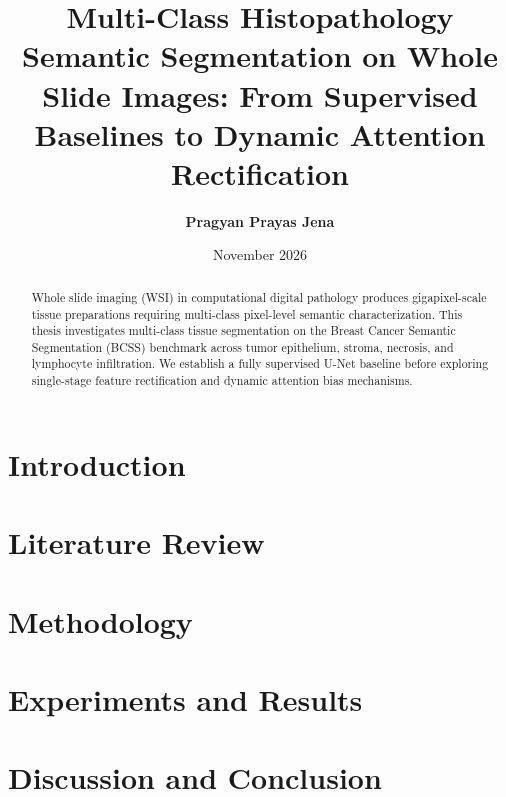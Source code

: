 \documentclass[12pt,a4paper,oneside]{report}
\title{\textbf{Multi-Class Histopathology Semantic Segmentation on Whole Slide Images: From Supervised Baselines to Dynamic Attention Rectification}}
\author{\textbf{Pragyan Prayas Jena}}
\date{November 2026}
\begin{document}
\maketitle

\begin{abstract}
Whole slide imaging (WSI) in computational digital pathology produces gigapixel-scale tissue preparations requiring multi-class pixel-level semantic characterization. This thesis investigates multi-class tissue segmentation on the Breast Cancer Semantic Segmentation (BCSS) benchmark across tumor epithelium, stroma, necrosis, and lymphocyte infiltration. We establish a fully supervised U-Net baseline before exploring single-stage feature rectification and dynamic attention bias mechanisms.
\end{abstract}

\tableofcontents

\chapter{Introduction}


\chapter{Literature Review}


\chapter{Methodology}


\chapter{Experiments and Results}


\chapter{Discussion and Conclusion}




\end{document}
